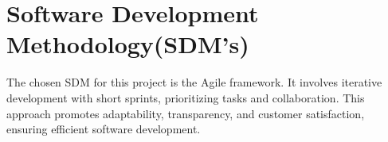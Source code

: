\section{Software Development Methodology(SDM's)}
The chosen SDM for this project is the Agile framework. It involves iterative development with short sprints, prioritizing tasks and collaboration. This approach promotes adaptability, transparency, and customer satisfaction, ensuring efficient software development.
